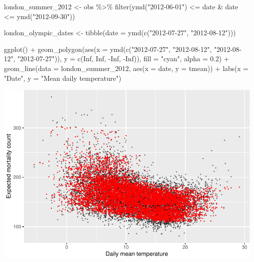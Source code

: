 \documentclass[
]{book}
\newenvironment{Shaded}{\begin{snugshade}}{\end{snugshade}}
\newcommand{\AttributeTok}[1]{\textcolor[rgb]{0.77,0.63,0.00}{#1}}
\newcommand{\ConstantTok}[1]{\textcolor[rgb]{0.00,0.00,0.00}{#1}}
\newcommand{\FloatTok}[1]{\textcolor[rgb]{0.00,0.00,0.81}{#1}}
\newcommand{\FunctionTok}[1]{\textcolor[rgb]{0.00,0.00,0.00}{#1}}
\newcommand{\NormalTok}[1]{#1}
\newcommand{\OtherTok}[1]{\textcolor[rgb]{0.56,0.35,0.01}{#1}}
\newcommand{\SpecialCharTok}[1]{\textcolor[rgb]{0.00,0.00,0.00}{#1}}
\newcommand{\StringTok}[1]{\textcolor[rgb]{0.31,0.60,0.02}{#1}}
\begin{document}
\begin{Shaded}
\begin{Highlighting}[]
\NormalTok{london\_summer\_2012 }\OtherTok{\textless{}{-}}\NormalTok{ obs }\SpecialCharTok{\%\textgreater{}\%} 
  \FunctionTok{filter}\NormalTok{(}\FunctionTok{ymd}\NormalTok{(}\StringTok{"2012{-}06{-}01"}\NormalTok{) }\SpecialCharTok{\textless{}=}\NormalTok{ date }\SpecialCharTok{\&}\NormalTok{ date }\SpecialCharTok{\textless{}=} \FunctionTok{ymd}\NormalTok{(}\StringTok{"2012{-}09{-}30"}\NormalTok{))}

\NormalTok{london\_olympic\_dates }\OtherTok{\textless{}{-}} \FunctionTok{tibble}\NormalTok{(}\AttributeTok{date =} \FunctionTok{ymd}\NormalTok{(}\FunctionTok{c}\NormalTok{(}\StringTok{"2012{-}07{-}27"}\NormalTok{, }\StringTok{"2012{-}08{-}12"}\NormalTok{)))}

\FunctionTok{ggplot}\NormalTok{() }\SpecialCharTok{+} 
  \FunctionTok{geom\_polygon}\NormalTok{(}\FunctionTok{aes}\NormalTok{(}\AttributeTok{x =} \FunctionTok{ymd}\NormalTok{(}\FunctionTok{c}\NormalTok{(}\StringTok{"2012{-}07{-}27"}\NormalTok{, }\StringTok{"2012{-}08{-}12"}\NormalTok{, }
                             \StringTok{"2012{-}08{-}12"}\NormalTok{, }\StringTok{"2012{-}07{-}27"}\NormalTok{)), }
                   \AttributeTok{y =} \FunctionTok{c}\NormalTok{(}\ConstantTok{Inf}\NormalTok{, }\ConstantTok{Inf}\NormalTok{, }\SpecialCharTok{{-}}\ConstantTok{Inf}\NormalTok{, }\SpecialCharTok{{-}}\ConstantTok{Inf}\NormalTok{)), }\AttributeTok{fill =} \StringTok{"cyan"}\NormalTok{, }\AttributeTok{alpha =} \FloatTok{0.2}\NormalTok{) }\SpecialCharTok{+} 
  \FunctionTok{geom\_line}\NormalTok{(}\AttributeTok{data =}\NormalTok{ london\_summer\_2012, }\FunctionTok{aes}\NormalTok{(}\AttributeTok{x =}\NormalTok{ date, }\AttributeTok{y =}\NormalTok{ tmean)) }\SpecialCharTok{+} 
  \FunctionTok{labs}\NormalTok{(}\AttributeTok{x =} \StringTok{"Date"}\NormalTok{, }\AttributeTok{y =} \StringTok{"Mean daily temperature"}\NormalTok{)}
\end{Highlighting}
\end{Shaded}

\includegraphics{adv_epi_analysis_files/figure-latex/unnamed-chunk-60-1.pdf}
\end{document}
